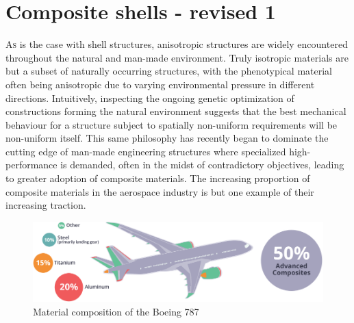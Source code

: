 



\chapter{Composite shells - revised 1}
\label{chap:chapter_2_1}

\renewcommand{\Thema}{Composite shells}

\lettrine[lines=2]{A}{s} is the case with shell structures, anisotropic structures are widely encountered throughout the natural and man-made environment. Truly isotropic materials are but a subset of naturally occurring structures, with the phenotypical material often being anisotropic due to varying environmental pressure in different directions. Intuitively, inspecting the ongoing genetic optimization of constructions forming the natural environment suggests that the best mechanical behaviour for a structure subject to spatially non-uniform requirements will be non-uniform itself. This same philosophy has recently began to dominate the cutting edge of man-made engineering structures where specialized high-performance is demanded, often in the midst of contradictory objectives, leading to greater adoption of composite materials. The increasing proportion of composite materials in the aerospace industry is but one example of their increasing traction.

\begin{figure}[H]
	\centering
	\def\svgwidth{\columnwidth}
	\includegraphics[width=14cm]{images/composites_aerospace.png}
	\caption{Material composition of the Boeing 787 \cite{AMCA2017}}
	\label{composite_aerospace}
\end{figure}

